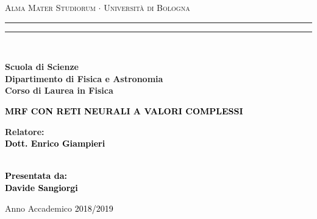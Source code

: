 \documentclass[a4paper,12pt]{report}
\begin{document}
\begin{titlepage}
%
%
%
%
\begin{center}
{{\Large{\textsc{Alma Mater Studiorum $\cdot$ Universit\`a di Bologna}}}} 
\rule[0.1cm]{15.8cm}{0.1mm}
\rule[0.5cm]{15.8cm}{0.6mm}
\\\vspace{3mm}

{\small{\bf Scuola di Scienze \\ 
Dipartimento di Fisica e Astronomia\\
Corso di Laurea in Fisica}}

\end{center}

\vspace{23mm}

\begin{center}\textcolor{black}{
%
%
{\LARGE{\bf MRF CON RETI NEURALI A VALORI COMPLESSI}}\\
}\end{center}

\vspace{50mm} \par \noindent

\begin{minipage}[t]{0.47\textwidth}
%
%
{\large{\bf Relatore: \vspace{2mm}\\\textcolor{black}{
Dott. Enrico Giampieri}\\\\}}
%
%
\end{minipage}
%
\hfill
%
\begin{minipage}[t]{0.47\textwidth}\raggedleft \textcolor{black}{
{\large{\bf Presentata da:
\vspace{2mm}\\
%
%
Davide Sangiorgi}}}
\end{minipage}

\vspace{40mm}

\begin{center}
%
%
Anno Accademico \textcolor{black}{ 2018/2019}
\end{center}

\end{titlepage}
\end{document}

